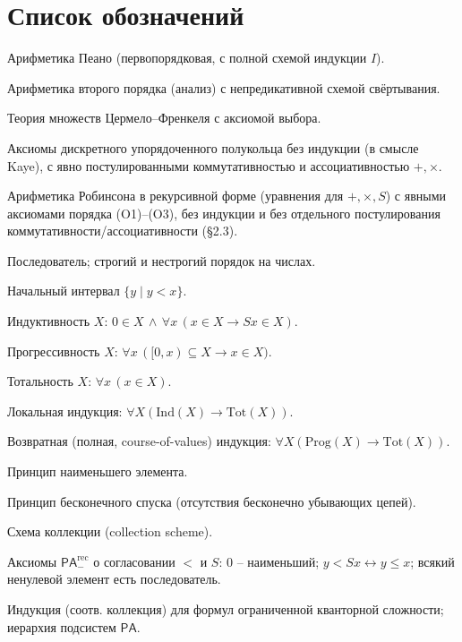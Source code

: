 \documentclass[12pt,a4paper]{article}
\theoremstyle{plain}
\theoremstyle{definition}
\newcommand{\toinf}{\rightarrow}
\newcommand{\PA}{\textsf{PA}}
\newcommand{\Ztwo}{\textsf{Z}_2}
\newcommand{\ZFC}{\textsf{ZFC}}
\newcommand{\PArec}{\PA^{\mathrm{rec}}_{-}}
\begin{document}
\section*{Список обозначений}
\begin{description}[leftmargin=3.2cm, style=nextline, font=\normalfont]
    \item[$\PA$] Арифметика Пеано (первопорядковая, с полной схемой индукции $I$).
    \item[$\Ztwo$] Арифметика второго порядка (анализ) с непредикативной схемой свёртывания.
    \item[$\ZFC$] Теория множеств Цермело--Френкеля с аксиомой выбора.
    \item[$\PA^-$] Аксиомы дискретного упорядоченного полукольца без индукции (в смысле Kaye), с явно постулированными коммутативностью и ассоциативностью $+,\times$.
    \item[$\PArec$] Арифметика Робинсона в рекурсивной форме (уравнения для $+,\times,S$) с явными аксиомами порядка (O1)--(O3), без индукции и без отдельного постулирования коммутативности/ассоциативности (§2.3).
    \item[$S$, $<$, $\leqslant$] Последователь; строгий и нестрогий порядок на числах.
    \item[$[0,x)$] Начальный интервал $\{y \mid y<x\}$.
    \item[$\mathrm{Ind}(X)$] Индуктивность $X$: $0\in X\,\land\,\forall x\,(x\in X\toinf Sx\in X)$.
    \item[$\mathrm{Prog}(X)$] Прогрессивность $X$: $\forall x\,([0,x)\subseteq X\toinf x\in X)$.
    \item[$\mathrm{Tot}(X)$] Тотальность $X$: $\forall x\,(x\in X)$.
    \item[$I$] Локальная индукция: $\forall X(\mathrm{Ind}(X)\toinf\mathrm{Tot}(X))$.
    \item[$I^*$] Возвратная (полная, course-of-values) индукция: $\forall X(\mathrm{Prog}(X)\toinf\mathrm{Tot}(X))$.
    \item[$L$] Принцип наименьшего элемента.
    \item[$D$] Принцип бесконечного спуска (отсутствия бесконечно убывающих цепей).
    \item[$B$] Схема коллекции (collection scheme).
    \item[(O1)--(O3)] Аксиомы $\PArec$ о согласовании $<$ и $S$: $0$ -- наименьший; $y<Sx\leftrightarrow y\leqslant x$; всякий ненулевой элемент есть последователь.
    \item[$I\Sigma_n$, $B\Sigma_n$, $I\Delta_0$] Индукция (соотв. коллекция) для формул ограниченной кванторной сложности; иерархия подсистем $\PA$.

\end{description}
\end{document}
